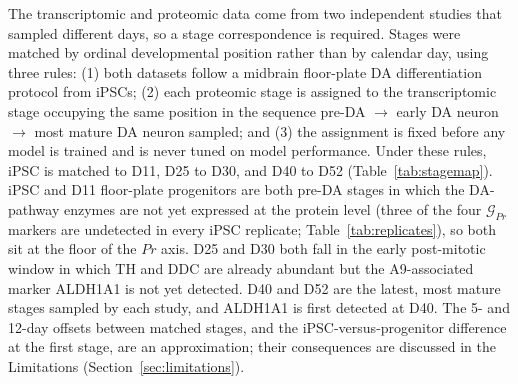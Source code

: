 \documentclass[5p,times,twocolumn]{elsarticle}
\newcommand{\rtag}[1]{}
\newenvironment{revblock}[1]{\par\color{red}\rtag{#1}\ignorespaces}{\par}
\begin{document}
\begin{revblock}{R2.3,R2.22}
  The transcriptomic and proteomic data come from two
  independent studies that sampled different days, so a stage
  correspondence is required.
  Stages were matched by ordinal developmental
    position rather than by calendar day, using three rules:
  (1) both datasets follow a midbrain floor-plate DA
  differentiation protocol from iPSCs;
  (2) each proteomic stage is assigned to the transcriptomic
  stage occupying the same position in the sequence
  pre-DA $\to$ early DA neuron $\to$ most mature DA neuron
  sampled; and
  (3) the assignment is fixed before any model is trained
  and is never tuned on model performance.
  Under these rules, iPSC is matched to D11, D25 to D30, and
  D40 to D52 (Table~\ref{tab:stagemap}).
  iPSC and D11 floor-plate progenitors are both pre-DA stages
  in which the DA-pathway enzymes are not yet expressed at the
  protein level (three of the four $\mathcal{G}_{Pr}$ markers
  are undetected in every iPSC replicate;
  Table~\ref{tab:replicates}), so both sit at the floor of the
  $Pr$ axis. D25 and D30 both fall in the early post-mitotic
  window in which TH and DDC are already abundant but the
  A9-associated marker ALDH1A1 is not yet detected. D40 and D52
  are the latest, most mature stages sampled by each study, and
  ALDH1A1 is first detected at D40.
  The 5- and 12-day offsets between matched stages, and the
  iPSC-versus-progenitor difference at the first stage, are an
  approximation; their consequences are discussed in the
  Limitations (Section~\ref{sec:limitations}).
\end{revblock}

\begin{table}[!htbp]
  \color{red}
  \caption{\rtag{R2.10}Correspondence between transcriptomic and
    proteomic stages. $n$ is the number of cells (scRNA-seq) or of
    CTRL biological replicates (proteomics) at each stage.}
  \label{tab:stagemap}
  \centering
\end{table}
\end{document}
